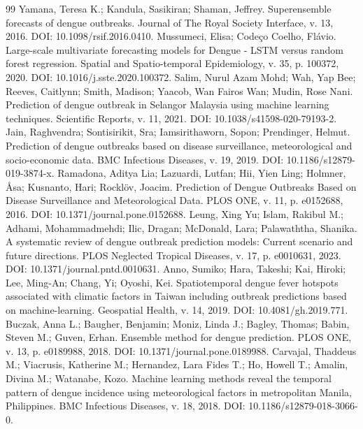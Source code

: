 \documentclass[12pt,a4paper]{article}
\begin{document}
\begin{thebibliography}{99}
 Yamana, Teresa K.; Kandula, Sasikiran; Shaman, Jeffrey. Superensemble forecasts of dengue outbreaks. Journal of The Royal Society Interface, v. 13, 2016. DOI: 10.1098/rsif.2016.0410.
 Mussumeci, Elisa; Codeço Coelho, Flávio. Large-scale multivariate forecasting models for Dengue - LSTM versus random forest regression. Spatial and Spatio-temporal Epidemiology, v. 35, p. 100372, 2020. DOI: 10.1016/j.sste.2020.100372.
 Salim, Nurul Azam Mohd; Wah, Yap Bee; Reeves, Caitlynn; Smith, Madison; Yaacob, Wan Fairos Wan; Mudin, Rose Nani. Prediction of dengue outbreak in Selangor Malaysia using machine learning techniques. Scientific Reports, v. 11, 2021. DOI: 10.1038/s41598-020-79193-2.
 Jain, Raghvendra; Sontisirikit, Sra; Iamsirithaworn, Sopon; Prendinger, Helmut. Prediction of dengue outbreaks based on disease surveillance, meteorological and socio-economic data. BMC Infectious Diseases, v. 19, 2019. DOI: 10.1186/s12879-019-3874-x.
 Ramadona, Aditya Lia; Lazuardi, Lutfan; Hii, Yien Ling; Holmner, Åsa; Kusnanto, Hari; Rocklöv, Joacim. Prediction of Dengue Outbreaks Based on Disease Surveillance and Meteorological Data. PLOS ONE, v. 11, p. e0152688, 2016. DOI: 10.1371/journal.pone.0152688.
 Leung, Xing Yu; Islam, Rakibul M.; Adhami, Mohammadmehdi; Ilic, Dragan; McDonald, Lara; Palawaththa, Shanika. A systematic review of dengue outbreak prediction models: Current scenario and future directions. PLOS Neglected Tropical Diseases, v. 17, p. e0010631, 2023. DOI: 10.1371/journal.pntd.0010631.
 Anno, Sumiko; Hara, Takeshi; Kai, Hiroki; Lee, Ming-An; Chang, Yi; Oyoshi, Kei. Spatiotemporal dengue fever hotspots associated with climatic factors in Taiwan including outbreak predictions based on machine-learning. Geospatial Health, v. 14, 2019. DOI: 10.4081/gh.2019.771.
 Buczak, Anna L.; Baugher, Benjamin; Moniz, Linda J.; Bagley, Thomas; Babin, Steven M.; Guven, Erhan. Ensemble method for dengue prediction. PLOS ONE, v. 13, p. e0189988, 2018. DOI: 10.1371/journal.pone.0189988.
 Carvajal, Thaddeus M.; Viacrusis, Katherine M.; Hernandez, Lara Fides T.; Ho, Howell T.; Amalin, Divina M.; Watanabe, Kozo. Machine learning methods reveal the temporal pattern of dengue incidence using meteorological factors in metropolitan Manila, Philippines. BMC Infectious Diseases, v. 18, 2018. DOI: 10.1186/s12879-018-3066-0.

\end{thebibliography}
\end{document}
